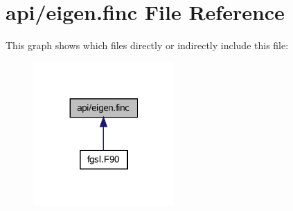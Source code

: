 \hypertarget{eigen_8finc}{}\section{api/eigen.finc File Reference}
\label{eigen_8finc}
This graph shows which files directly or indirectly include this file\+:\nopagebreak
\begin{figure}[H]
\begin{center}
\leavevmode
\includegraphics[width=152pt]{eigen_8finc__dep__incl}
\end{center}
\end{figure}
